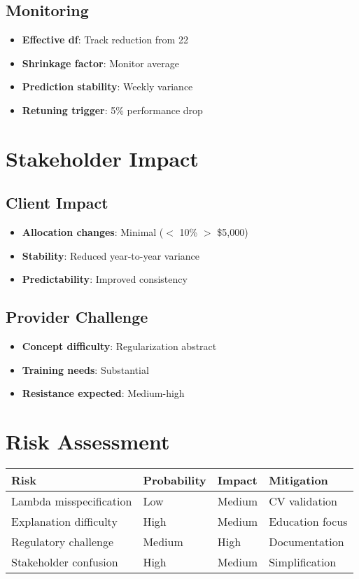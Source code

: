 \subsection{Monitoring}

\begin{itemize}
    \item \textbf{Effective df}: Track reduction from 22
    \item \textbf{Shrinkage factor}: Monitor average
    \item \textbf{Prediction stability}: Weekly variance
    \item \textbf{Retuning trigger}: 5\% performance drop
\end{itemize}

\section{Stakeholder Impact}

\subsection{Client Impact}

\begin{itemize}
    \item \textbf{Allocation changes}: Minimal ($<$ 10\% $>$ \$5,000)
    \item \textbf{Stability}: Reduced year-to-year variance
    \item \textbf{Predictability}: Improved consistency
\end{itemize}

\subsection{Provider Challenge}

\begin{itemize}
    \item \textbf{Concept difficulty}: Regularization abstract
    \item \textbf{Training needs}: Substantial
    \item \textbf{Resistance expected}: Medium-high
\end{itemize}

\section{Risk Assessment}

\begin{center}
\begin{tabular}{llll}
\toprule
Risk & Probability & Impact & Mitigation \\
\midrule
Lambda misspecification & Low & Medium & CV validation \\
Explanation difficulty & High & Medium & Education focus \\
Regulatory challenge & Medium & High & Documentation \\
Stakeholder confusion & High & Medium & Simplification \\
\bottomrule
\end{tabular}
\end{center}

